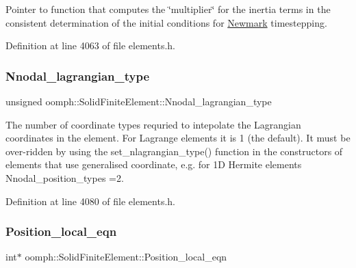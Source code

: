 Pointer to function that computes the \char`\"{}multiplier\char`\"{} for the inertia terms in the consistent determination of the initial conditions for \hyperlink{classoomph_1_1Newmark}{Newmark} timestepping. 



Definition at line 4063 of file elements.\+h.

\mbox{\label{classoomph_1_1SolidFiniteElement_a82f45b63fe051fc87deae77c6e6106e6}} 
\subsubsection{\texorpdfstring{Nnodal\+\_\+lagrangian\+\_\+type}{Nnodal\_lagrangian\_type}}
{\footnotesize\ttfamily unsigned oomph\+::\+Solid\+Finite\+Element\+::\+Nnodal\+\_\+lagrangian\+\_\+type\hspace{0.3cm}{\ttfamily [private]}}



The number of coordinate types requried to intepolate the Lagrangian coordinates in the element. For Lagrange elements it is 1 (the default). It must be over-\/ridden by using the set\+\_\+nlagrangian\+\_\+type() function in the constructors of elements that use generalised coordinate, e.\+g. for 1D Hermite elements Nnodal\+\_\+position\+\_\+types =2. 



Definition at line 4080 of file elements.\+h.

\mbox{\label{classoomph_1_1SolidFiniteElement_a32e61585f928d3cec6d61033a971776e}} 
\subsubsection{\texorpdfstring{Position\+\_\+local\+\_\+eqn}{Position\_local\_eqn}}
{\footnotesize\ttfamily int$\ast$ oomph\+::\+Solid\+Finite\+Element\+::\+Position\+\_\+local\+\_\+eqn\hspace{0.3cm}{\ttfamily [private]}}



